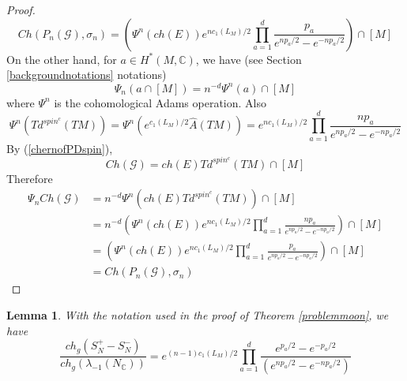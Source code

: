 \documentclass[11pt,leqno,twoside]{amsart}
\theoremstyle{plainsl}
\newtheorem{lemma}[theorem]{Lemma}
\theoremstyle{definition}
\begin{document}
\begin{proof}
\[\]
\begin{equation}\label{chgcomputation}
Ch(P_n(\mathcal{G}),\sigma_n)
=
\left(
\Psi^n(ch(E))
e^{nc_1(L_M)/2}
\prod_{a=1}^d
\frac{p_a}{e^{np_a/2}-e^{-np_a/2}}
\right)\cap[M]
\end{equation}
On the other hand, for $a\in H^*(M,\mathbb{C})$, we have (see Section \ref{backgroundnotations} notations)
\[
\Psi_n(a\cap[M])
=
n^{-d}\Psi^n(a)\cap[M]
\]
where $\Psi^n$ is the cohomological Adams operation. Also
\[
\Psi^n(Td^{spin^c}(TM))
=
\Psi^n\left(
e^{c_1(L_M)/2}\hat{A}(TM)
\right)
=
e^{nc_1(L_M)/2}
\prod_{a=1}^d
\frac{np_a}{e^{np_a/2}-e^{-np_a/2}}
\]
By 
(\ref{chernofPDspin}), 
\[
Ch(\mathcal G)
=
ch(E)Td^{spin^c}(TM)\cap[M]
\]
Therefore
\[
\begin{aligned}
\Psi_n Ch(\mathcal G)
&=
n^{-d}\Psi^n
\left(
ch(E)Td^{spin^c}(TM)
\right)\cap[M]
\\
&=
n^{-d}
\left(
\Psi^n(ch(E))
e^{nc_1(L_M)/2}
\prod_{a=1}^d
\frac{np_a}{e^{np_a/2}-e^{-np_a/2}}
\right)\cap[M]
\\
&=
\left(
\Psi^n(ch(E))
e^{nc_1(L_M)/2}
\prod_{a=1}^d
\frac{p_a}{e^{np_a/2}-e^{-np_a/2}}
\right)\cap[M]\\
&=Ch(P_n(\mathcal{G}),\sigma_n)
\end{aligned}
\]
\end{proof}
\begin{lemma}\label{chofeulerfactor} With the notation used in the proof of Theorem \ref{problemmoon}, we have 
    \[\frac{ch_g(S^{+}_N-S^{-}_N)}{ch_g(\lambda_{-1}(N_{\mathbb{C}}))}=e^{(n-1)c_1(L_M)/2}\prod^d_{a=1} \frac{e^{p_a/2}-e^{-p_a/2}}{ (e^{np_a/2}-e^{-np_a/2})}\]
\end{lemma}
\end{document}
